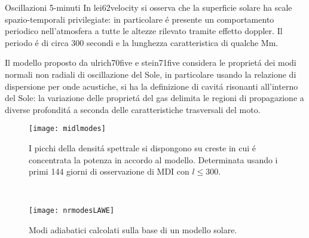 \begin{frame}{Oscillazioni 5-minuti}
In lei62velocity si osserva che la superficie solare ha scale spazio-temporali privilegiate: in particolare \'e presente un comportamento periodico nell'atmosfera a tutte le altezze rilevato tramite effetto doppler. Il periodo \'e di circa 300 secondi e la lunghezza caratteristica di qualche \si{\mega\meter}.

Il modello proposto da ulrich70five e stein71five considera le propriet\'a dei modi normali non radiali di oscillazione del Sole, in particolare usando la relazione di dispersione per onde acustiche, si ha la definizione di cavit\'a risonanti all'interno del Sole: la variazione delle propriet\'a del gas delimita le regioni di propagazione a diverse profondit\'a a seconda delle caratteristiche trasversali del moto.
\begin{minipage}[t]{0.62\paperwidth}
\begin{figure}[!ht]
\texttt{[image: midlmodes]}
\caption{I picchi della densit\'a spettrale si dispongono su creste in cui \'e concentrata la potenza in accordo al modello. Determinata usando i primi 144 giorni di osservazione di MDI con $l\leq300$.}
\end{figure}
\end{minipage}~
\begin{minipage}[t]{0.32\paperwidth}
\begin{figure}[!ht]
\texttt{[image: nrmodesLAWE]}
\caption{Modi adiabatici calcolati sulla base di un modello solare.}
\end{figure}
\end{minipage}
\end{frame}

